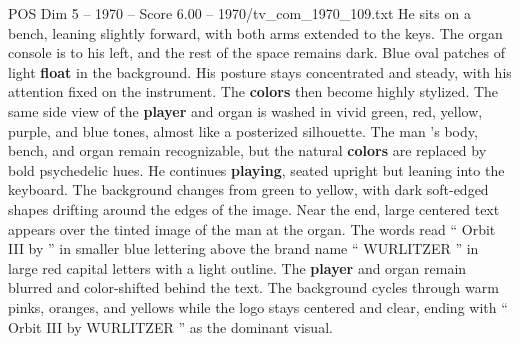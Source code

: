 \begin{textsample}{POS Dim 5 – 1970 – Score 6.00 – 1970/tv\_com\_1970\_109.txt}
He sits on a bench, leaning slightly forward, with both arms extended to the keys.
The organ console is to his left, and the rest of the space remains dark.
Blue oval patches of light \textbf{float} in the background.
His posture stays concentrated and steady, with his attention fixed on the instrument.
The \textbf{colors} then become highly stylized.
The same side view of the \textbf{player} and organ is washed in vivid green, red, yellow, purple, and blue tones, almost like a posterized silhouette.
The man ’s body, bench, and organ remain recognizable, but the natural \textbf{colors} are replaced by bold psychedelic hues.
He continues \textbf{playing}, seated upright but leaning into the keyboard.
The background changes from green to yellow, with dark soft-edged shapes drifting around the edges of the image.
Near the end, large centered text appears over the tinted image of the man at the organ.
The words read “ Orbit III by ” in smaller blue lettering above the brand name “ WURLITZER ” in large red capital letters with a light outline.
The \textbf{player} and organ remain blurred and color-shifted behind the text.
The background cycles through warm pinks, oranges, and yellows while the logo stays centered and clear, ending with “ Orbit III by WURLITZER ” as the dominant visual.

\end{textsample}
